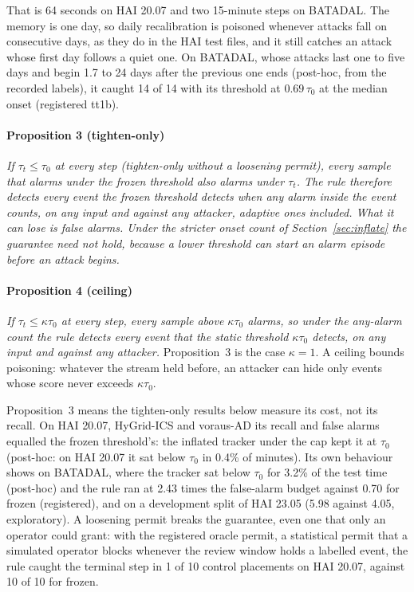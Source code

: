 \documentclass[sigconf,review,anonymous]{acmart}
\begin{document}
That is 64 seconds on HAI 20.07 and two 15-minute steps on BATADAL. The memory is one day, so daily
recalibration is poisoned whenever attacks fall on consecutive days, as they do in the HAI test
files, and it still catches an attack whose first day follows a quiet one. On BATADAL, whose attacks
last one to five days and begin 1.7 to 24 days after the previous one ends (post-hoc, from the recorded
labels), it caught 14 of 14 with its threshold at $0.69\,\tau_0$ at the median onset (registered tt1b).

\paragraph{Proposition 3 (tighten-only)} \emph{If $\tau_t \le \tau_0$ at every step (tighten-only
without a loosening permit), every sample that alarms under the frozen threshold also alarms under
$\tau_t$. The rule therefore detects every event the frozen threshold detects when any alarm inside the
event counts, on any input and against any attacker, adaptive ones included. What it can lose is false
alarms. Under the stricter onset count of Section~\ref{sec:inflate} the guarantee need not hold,
because a lower threshold can start an alarm episode before an attack begins.}

\paragraph{Proposition 4 (ceiling)} \emph{If $\tau_t \le \kappa\tau_0$ at every step, every sample above
$\kappa\tau_0$ alarms, so under the any-alarm count the rule detects every event that the static
threshold $\kappa\tau_0$ detects, on any input and against any attacker.} Proposition~3 is the case
$\kappa = 1$. A ceiling bounds poisoning: whatever the stream held before, an attacker can hide only
events whose score never exceeds $\kappa\tau_0$.

Proposition~3 means the tighten-only results below measure its cost, not its recall. On HAI 20.07,
HyGrid-ICS and voraus-AD its recall and false alarms equalled the frozen threshold's: the inflated
tracker under the cap kept it at $\tau_0$ (post-hoc: on HAI 20.07 it sat below $\tau_0$ in 0.4\% of
minutes). Its own behaviour shows on BATADAL, where the tracker sat below $\tau_0$ for 3.2\% of the
test time (post-hoc) and the rule ran at 2.43 times the false-alarm budget against 0.70 for frozen
(registered), and on a development split of HAI 23.05 (5.98 against 4.05, exploratory). A loosening
permit breaks the guarantee, even one that only an operator could grant: with the registered oracle
permit, a statistical permit that a simulated operator blocks whenever the review window holds a
labelled event, the rule caught the terminal step in 1 of 10 control placements on HAI 20.07, against
10 of 10 for frozen.
\end{document}
